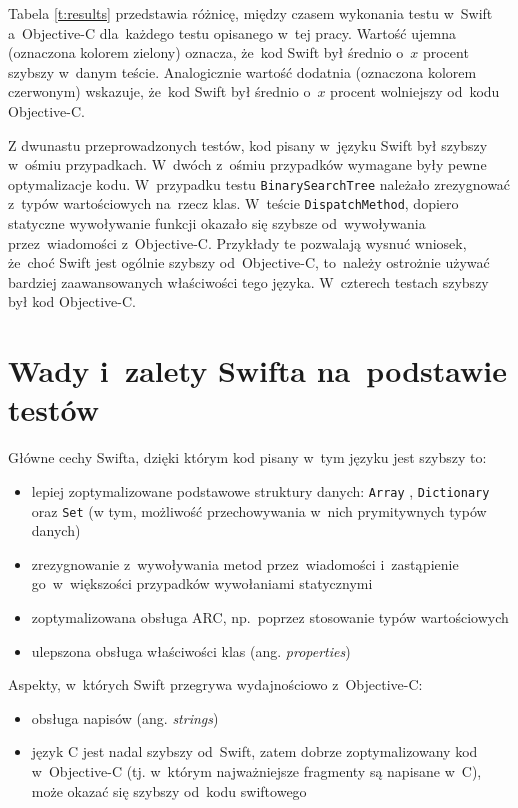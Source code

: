\documentclass[mgr, shortabstract]{iithesis}
\newcommand{\ang}[1]{ang. \textit{#1}}
\newcommand{\swiftinline}[1]{
    \texttt{#1}
}
\begin{document}
Tabela \ref{t:results} przedstawia różnicę, między czasem wykonania testu w~Swift a~Objective-C dla~każdego testu opisanego w~tej pracy. Wartość ujemna (oznaczona kolorem zielony) oznacza, że~kod Swift był średnio o~$x$ procent szybszy w~danym teście. Analogicznie wartość dodatnia (oznaczona kolorem czerwonym) wskazuje, że~kod Swift był średnio o~$x$ procent wolniejszy od~kodu Objective-C.

Z dwunastu przeprowadzonych testów, kod pisany w~języku Swift był szybszy w~ośmiu przypadkach. W~dwóch z~ośmiu przypadków wymagane były pewne optymalizacje kodu. W~przypadku testu \texttt{BinarySearchTree} należało zrezygnować z~typów wartościowych na~rzecz klas. W~teście \texttt{DispatchMethod}, dopiero statyczne wywoływanie funkcji okazało się szybsze od~wywoływania przez~wiadomości z~Objective-C. Przykłady te pozwalają wysnuć wniosek, że~choć Swift jest ogólnie szybszy od~Objective-C, to~należy ostrożnie używać bardziej zaawansowanych właściwości tego języka. W~czterech testach szybszy był kod Objective-C.

\section{Wady i~zalety Swifta na~podstawie testów}

Główne cechy Swifta, dzięki którym kod pisany w~tym języku jest szybszy to:
\begin{itemize}
    \item lepiej zoptymalizowane podstawowe struktury danych: \swiftinline{Array}, \swiftinline{Dictionary} oraz \swiftinline{Set} (w tym, możliwość przechowywania w~nich prymitywnych typów danych)
    \item zrezygnowanie z~wywoływania metod przez~wiadomości i~zastąpienie go~w~większości przypadków wywołaniami statycznymi
    \item zoptymalizowana obsługa ARC, np.~poprzez stosowanie typów wartościowych   
    \item ulepszona obsługa właściwości klas (\ang{properties})    
\end{itemize}

Aspekty, w~których Swift przegrywa wydajnościowo z~Objective-C:
\begin{itemize}
    \item obsługa napisów (\ang{strings})
    \item język C jest nadal szybszy od~Swift, zatem dobrze zoptymalizowany kod w~Objective-C (tj. w~którym najważniejsze fragmenty są napisane w~C), może okazać się szybszy od~kodu swiftowego
\end{itemize}
\end{document}
